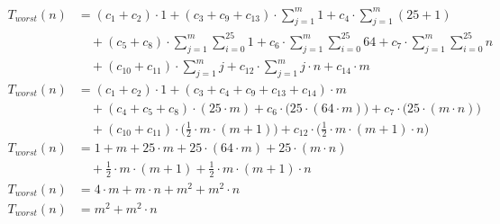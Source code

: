 \begin{subequations}
\label{eq:findlinesegments-worst}
\begin{align}
\label{eq:findlinesegments20}
T_{worst}(n)& = (c_{1} + c_{2}) \cdot 1 + (c_{3} + c_{9} + c_{13}) \cdot \sum_{j=1}^{m}1 + c_{4} \cdot \sum_{j=1}^{m}
 (25 + 1) \\
& \quad + (c_{5} + c_{8}) \cdot \sum_{j=1}^{m} \sum_{i=0}^{25} 1 + c_{6} \cdot \sum_{j=1}^{m} \sum_{i=0}^{25} 64 +
 c_{7} \cdot \sum_{j=1}^{m} \sum_{i=0}^{25} n \nonumber \\
& \quad + (c_{10} + c_{11})\cdot \sum_{j=1}^{m}j + c_{12} \cdot \sum_{j=1}^{m} j \cdot n + c_{14} \cdot m \nonumber \\
\label{eq:findlinesegments21}
T_{worst}(n)& = (c_{1} + c_{2}) \cdot 1 + (c_{3} + c_{4} + c_{9} + c_{13} + c_{14}) \cdot m \\
& \quad + (c_{4} + c_{5} + c_{8}) \cdot (25 \cdot m) + c_{6} \cdot \bigl(25 \cdot (64 \cdot m)\bigr) + c_{7} \cdot \bigl(25 \cdot (m \cdot
 n)\bigr) \nonumber \\
& \quad + (c_{10} + c_{11}) \cdot \bigl(\frac{1}{2} \cdot m \cdot (m + 1)\bigr) + c_{12} \cdot \bigl(\frac{1}{2} \cdot m \cdot (m + 1) \cdot n\bigr) \nonumber \\
\label{eq:findlinesegments22}
T_{worst}(n)& = 1 + m + 25 \cdot m + 25 \cdot (64 \cdot m) + 25 \cdot (m \cdot n) \\
& \quad + \frac{1}{2} \cdot m \cdot (m + 1) + \frac{1}{2} \cdot m \cdot (m + 1) \cdot n \nonumber \\
\label{eq:findlinesegments23}
T_{worst}(n)& = 4 \cdot m + m \cdot n + m^2 + m^2 \cdot n \\
\label{eq:findlinesegments24}
T_{worst}(n)& = m^2 + m^2 \cdot n
\end{align}
\end{subequations}
